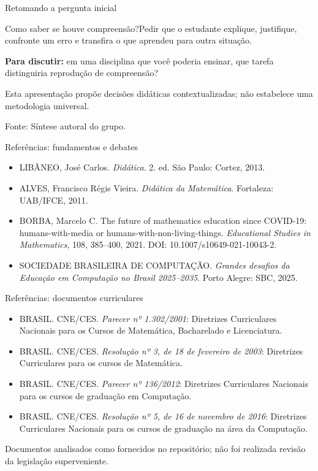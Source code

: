 \documentclass[aspectratio=169,11pt]{beamer}
\newcommand{\fonte}[1]{\par\vfill{\tiny\color{gray}Fonte: #1}}
\begin{document}
\begin{frame}{Retomando a pergunta inicial}
\begin{block}{Como saber se houve compreensão?}Pedir que o estudante explique, justifique, confronte um erro e transfira o que aprendeu para outra situação.\end{block}\medskip\textbf{Para discutir:} em uma disciplina que você poderia ensinar, que tarefa distinguiria reprodução de compreensão?\medskip\par Esta apresentação propõe decisões didáticas contextualizadas; não estabelece uma metodologia universal.
\fonte{Síntese autoral do grupo.}
\end{frame}
\begin{frame}{Referências: fundamentos e debates}
\small \begin{itemize}\item LIBÂNEO, José Carlos. \textit{Didática}. 2. ed. São Paulo: Cortez, 2013.\item ALVES, Francisco Régis Vieira. \textit{Didática da Matemática}. Fortaleza: UAB/IFCE, 2011.\item BORBA, Marcelo C. The future of mathematics education since COVID-19: humans-with-media or humans-with-non-living-things. \textit{Educational Studies in Mathematics}, 108, 385--400, 2021. DOI: 10.1007/s10649-021-10043-2.\item SOCIEDADE BRASILEIRA DE COMPUTAÇÃO. \textit{Grandes desafios da Educação em Computação no Brasil 2025--2035}. Porto Alegre: SBC, 2025.\end{itemize}
\end{frame}
\begin{frame}{Referências: documentos curriculares}
\small \begin{itemize}\item BRASIL. CNE/CES. \textit{Parecer nº 1.302/2001}: Diretrizes Curriculares Nacionais para os Cursos de Matemática, Bacharelado e Licenciatura.\item BRASIL. CNE/CES. \textit{Resolução nº 3, de 18 de fevereiro de 2003}: Diretrizes Curriculares para os cursos de Matemática.\item BRASIL. CNE/CES. \textit{Parecer nº 136/2012}: Diretrizes Curriculares Nacionais para os cursos de graduação em Computação.\item BRASIL. CNE/CES. \textit{Resolução nº 5, de 16 de novembro de 2016}: Diretrizes Curriculares Nacionais para os cursos de graduação na área da Computação.\end{itemize}\medskip\footnotesize Documentos analisados como fornecidos no repositório; não foi realizada revisão da legislação superveniente.
\end{frame}
\end{document}
